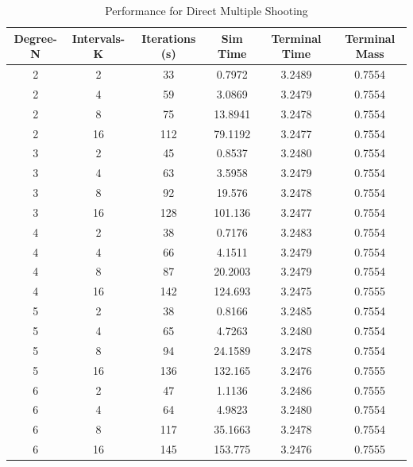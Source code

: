 \documentclass[]{article}
\begin{document}
\FloatBarrier
\begin{table}
	\centering
	\begin{tabular}{||c c c c c c||} 
		\hline
		Degree-N & Intervals-K & Iterations (s) & Sim Time & Terminal Time & Terminal Mass\\ [0.5ex] 
		\hline\hline
		2        & 2           & 33             & 0.7972   & 3.2489     & 0.7554\\ 
		\hline
		2        & 4           & 59             & 3.0869   & 3.2479     & 0.7554\\
		\hline
		2        & 8           & 75             & 13.8941  & 3.2478     & 0.7554\\
		\hline
		2        & 16          & 112            & 79.1192  & 3.2477     & 0.7554\\
		\hline
		3        & 2           & 45             & 0.8537   & 3.2480     & 0.7554\\
		\hline
		3        & 4           & 63             & 3.5958   & 3.2479     & 0.7554\\
		\hline
		3        & 8           & 92             & 19.576   & 3.2478     & 0.7554\\
		\hline
		3        & 16          & 128            & 101.136  & 3.2477     & 0.7554\\
		\hline
		4        & 2           & 38             & 0.7176   & 3.2483     & 0.7554\\
		\hline
		4        & 4           & 66             & 4.1511   & 3.2479     & 0.7554\\
		\hline
		4        & 8           & 87             & 20.2003  & 3.2479     & 0.7554\\
		\hline
		4        & 16          & 142            & 124.693  & 3.2475     & 0.7555\\
		\hline
		5        & 2           & 38             & 0.8166   & 3.2485     & 0.7554\\
		\hline
		5        & 4           & 65             & 4.7263   & 3.2480     & 0.7554\\
		\hline
		5        & 8           & 94             & 24.1589  & 3.2478     & 0.7554\\
		\hline
		5        & 16          & 136            & 132.165  & 3.2476     & 0.7555\\
		\hline
		6        & 2           & 47             & 1.1136   & 3.2486     & 0.7555\\
		\hline
		6        & 4           & 64             & 4.9823   & 3.2480     & 0.7554\\
		\hline
		6        & 8           & 117            & 35.1663  & 3.2478     & 0.7554\\
		\hline
		6        & 16          & 145            & 153.775  & 3.2476     & 0.7555\\ [1ex]
		\hline
	\end{tabular}
	\caption{Performance for Direct Multiple Shooting}
	\label{table:4}
\end{table}
\end{document}
